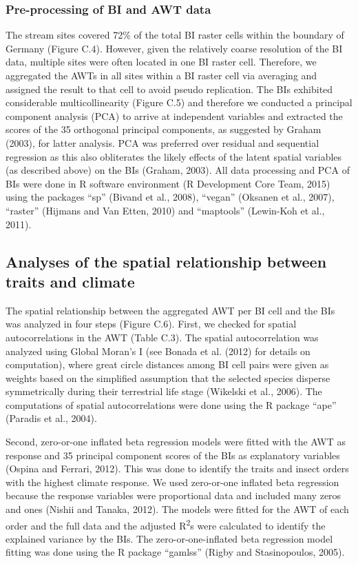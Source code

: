 \subsubsection{Pre-processing of BI and AWT data}
\label{Pre-processing of BI and AWT data}

The stream sites covered 72\% of the total BI raster cells within the boundary of Germany (Figure C.4). However, given the relatively coarse resolution of the BI data, multiple sites were often located in one BI raster cell. Therefore, we aggregated the AWTs in all sites within a BI raster cell via averaging and assigned the result to that cell to avoid pseudo replication. The BIs exhibited considerable multicollinearity (Figure C.5) and therefore we conducted a principal component analysis (PCA) to arrive at independent variables and extracted the scores of the 35 orthogonal principal components, as suggested by Graham (2003), for latter analysis. PCA was preferred over residual and sequential regression as this also obliterates the likely effects of the latent spatial variables (as described above) on the BIs (Graham, 2003). All data processing and PCA of BIs were done in R software environment (R Development Core Team, 2015) using the packages “sp” (Bivand et al., 2008), “vegan” (Oksanen et al., 2007), “raster” (Hijmans and Van Etten, 2010) and “maptools” (Lewin-Koh et al., 2011).

\subsection{Analyses of the spatial relationship between traits and climate}
\label{Analyses of the spatial relationship between traits and climate}

The spatial relationship between the aggregated AWT per BI cell and the BIs was analyzed in four steps (Figure C.6). First, we checked for spatial autocorrelations in the AWT (Table C.3). The spatial autocorrelation was analyzed using Global Moran's I (see Bonada et al. (2012) for details on computation), where great circle distances among BI cell pairs were given as weights based on the simplified assumption that the selected species disperse symmetrically during their terrestrial life stage (Wikelski et al., 2006). The computations of spatial autocorrelations were done using the R package “ape” (Paradis et al., 2004).

Second, zero-or-one inflated beta regression models were fitted with the AWT as response and 35 principal component scores of the BIs as explanatory variables (Ospina and Ferrari, 2012). This was done to identify the traits and insect orders with the highest climate response. We used zero-or-one inflated beta regression because the response variables were proportional data and included many zeros and ones (Nishii and Tanaka, 2012). The models were fitted for the AWT of each order and the full data and the adjusted R\textsuperscript{2}s were calculated to identify the explained variance by the BIs. The zero-or-one-inflated beta regression model fitting was done using the R package “gamlss” (Rigby and Stasinopoulos, 2005).

